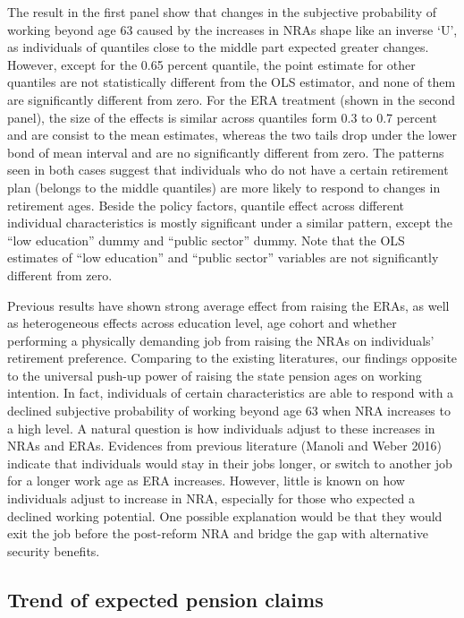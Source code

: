 \documentclass[a4paper]{article}
\begin{document}
The result in the first panel show that changes in the subjective probability of working beyond age 63 caused by the increases in NRAs shape like an inverse ‘U’, as individuals of quantiles close to the middle part expected greater changes. However, except for the 0.65 percent quantile, the point estimate for other quantiles are not statistically different from the OLS estimator, and none of them are significantly different from zero. For the ERA treatment (shown in the second panel), the size of the effects is similar across quantiles form 0.3 to 0.7 percent and are consist to the mean estimates, whereas the two tails drop under the lower bond of mean interval and are no significantly different from zero. The patterns seen in both cases suggest that individuals who do not have a certain retirement plan (belongs to the middle quantiles) are more likely to respond to changes in retirement ages. Beside the policy factors, quantile effect across different individual characteristics is mostly significant under a similar pattern, except the “low education” dummy and “public sector” dummy. Note that the OLS estimates of “low education” and “public sector” variables are not significantly different from zero.



Previous results have shown strong average effect from raising the ERAs, as well as heterogeneous effects across education level, age cohort and whether performing a physically demanding job from raising the NRAs on individuals’ retirement preference. Comparing to the existing literatures, our findings opposite to the universal push-up power of raising the state pension ages on working intention. In fact, individuals of certain characteristics are able to respond with a declined subjective probability of working beyond age 63 when NRA increases to a high level. A natural question is how individuals adjust to these increases in NRAs and ERAs. Evidences from previous literature (Manoli and Weber 2016) indicate that individuals would stay in their jobs longer, or switch to another job for a longer work age as ERA increases. However, little is known on how individuals adjust to increase in NRA, especially for those who expected a declined working potential. One possible explanation would be that they would exit the job before the post-reform NRA and bridge the gap with alternative security benefits.  

\subsection{Trend of expected pension claims}
\end{document}

